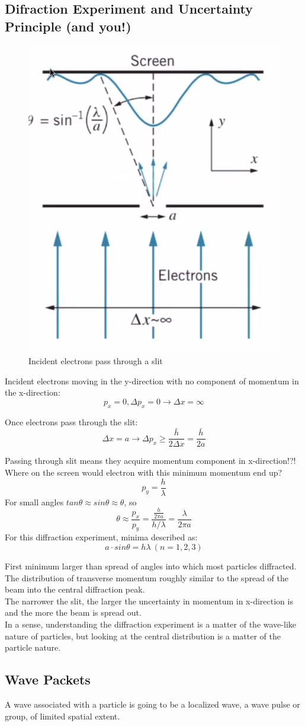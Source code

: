 \documentclass[class=article,crop=false]{standalone}
\begin{document}
\subsection{Difraction Experiment and Uncertainty Principle (and you!)}


\begin{figure}[h!]
	\centering
	\includegraphics[width=.2\linewidth]{./Images/diff_unc.png}
	\caption{Incident electrons pass through a slit}
\end{figure}

Incident electrons moving in the y-direction with no component of momentum in the x-direction:
$$ p_x = 0, \Delta p_x = 0 \rightarrow \Delta x = \infty $$

Once electrons pass through the slit:
$$ \Delta x = a \rightarrow \Delta p_x \geq \frac{\bar{h}}{2 \Delta x} = \frac{\bar{h}}{2a} $$

Passing through slit means they acquire momentum component in x-direction!?! \\

Where on the screen would electron with this minimum momentum end up?
$$p_y = \frac{h}{\lambda} $$
For small angles $tan \theta \approx sin\theta \approx \theta$, so 
$$ \theta \approx \frac{p_x}{p_y} = \frac{\frac{h}{2\pi a}}{h/\lambda} = \frac{\lambda}{2\pi a} $$
For this diffraction experiment, minima described as:
$$ a \cdot sin\theta = h\lambda\ (n=1,2,3) $$

First minimum larger than spread of angles into which most particles diffracted. The distribution of transverse momentum roughly similar to the spread of the beam into the central diffraction peak. \\

The narrower the slit, the larger the uncertainty in momentum in x-direction is and the more the beam is spread out. \\

In a sense, understanding the diffraction experiment is a matter of the wave-like nature of particles, but looking at the central distribution is a matter of the particle nature.\\


\subsection{Wave Packets}
A wave associated with a particle is going to be a localized wave, a wave pulse or group, of limited spatial extent.\\
\end{document}
